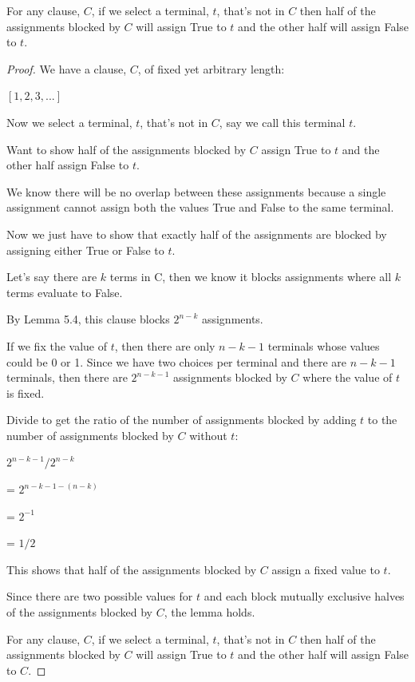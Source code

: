 \documentclass[manuscript]{acmart}
\begin{document}
    \begin{lemma}
        For any clause, $C$, if we select a terminal, $t$, that's not in $C$ 
        then half of the assignments
        blocked by $C$ will assign True to $t$ and the other half will assign 
        False to $t$.
    \end{lemma}
    \begin{proof}
        We have a clause, $C$, of fixed yet arbitrary length:

        $[1, 2, 3, ...]$

        Now we select a terminal, $t$, that's not in $C$, say we call this
        terminal $t$.

        Want to show half of the assignments blocked by $C$ assign True to 
        $t$ and the other half assign False to $t$.

        We know there will be no overlap between these assignments because a single assignment
        cannot assign both the values True and False to the same terminal.

        Now we just have to show that exactly half of the assignments are blocked 
        by assigning either True or False to $t$.

        Let's say there are $k$ terms in C, then we know it blocks assignments 
        where all $k$ terms evaluate to False.

        By Lemma 5.4, this clause blocks $2^{n-k}$ assignments. 

        If we fix the value of $t$, then there are only $n-k-1$ terminals
        whose values could be 0 or 1. Since we have two choices per terminal
        and there are $n-k-1$ terminals, then there are $2^{n-k-1}$ assignments
        blocked by $C$ where the value of $t$ is fixed.

        Divide to get the ratio of the number of assignments blocked by adding 
        $t$ to the number of assignments blocked by $C$ without $t$:
        
        $2^{n-k-1}/2^{n-k}$

        = $2^{n - k - 1 - (n - k)}$

        = $2^{-1}$

        = $1/2$

        This shows that half of the assignments blocked by $C$ assign a fixed
        value to $t$.

        Since there are two possible values for $t$ and each block mutually
        exclusive halves of the assignments blocked by $C$, the lemma holds.

        For any clause, $C$, if we select a terminal, $t$, that's not
        in $C$ then half of the assignments blocked by $C$ will assign True
        to $t$ and the other half will assign False to $C$.
    \end{proof}
\end{document}
